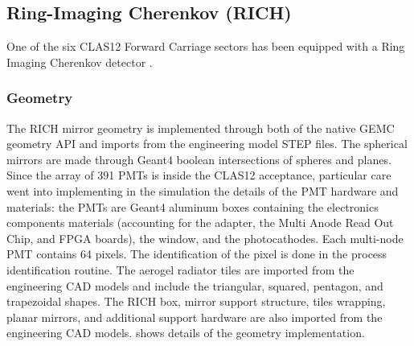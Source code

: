 \subsection{Ring-Imaging Cherenkov (RICH)}

One of the six CLAS12 Forward Carriage sectors has been equipped with a Ring Imaging Cherenkov detector \cite{rich-nim}.

\subsubsection{Geometry}
The RICH mirror geometry is implemented through both of the native GEMC geometry API and imports from the engineering model STEP files.
The spherical mirrors are made through Geant4 boolean intersections of spheres and planes.
Since the array of 391 PMTs is inside the CLAS12 acceptance, particular care went into implementing in the
simulation the details of the PMT hardware and materials: the PMTs are Geant4 aluminum boxes containing the electronics components materials
(accounting for the adapter, the  Multi Anode Read Out Chip, and FPGA boards), the window, and the photocathodes.
Each multi-node PMT contains 64 pixels. The identification of the pixel is done in the process identification routine.
The aerogel radiator tiles are imported from the engineering CAD models and include the triangular, squared, pentagon, and trapezoidal shapes.
The RICH box, mirror support structure, tiles wrapping, planar mirrors, and additional support hardware are also imported from the engineering CAD models.
 shows details of the geometry implementation.

